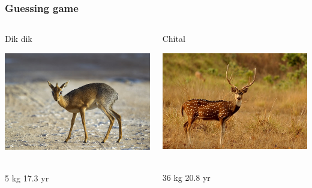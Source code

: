 \documentclass{beamer}
\begin{document}
\begin{frame}
  \frametitle{Guessing game}
  \begin{columns}[c]
     \begin{block}{Dik dik}
      \begin{center}
        \includegraphics[height=.25\textheight]{640px-Madoqua_kirkii_-_female_(Namutoni).jpg}\
      \end{center}
      5 kg \hfill 17.3 yr
    \end{block}
    
     \begin{block}{Chital}
      \begin{center}
        \includegraphics[height=.25\textheight]{640px-A_chital_stag_1.jpg}\
      \end{center}
      36 kg  \hfill 20.8 yr
    \end{block}


\end{columns}
\end{frame}
\end{document}
